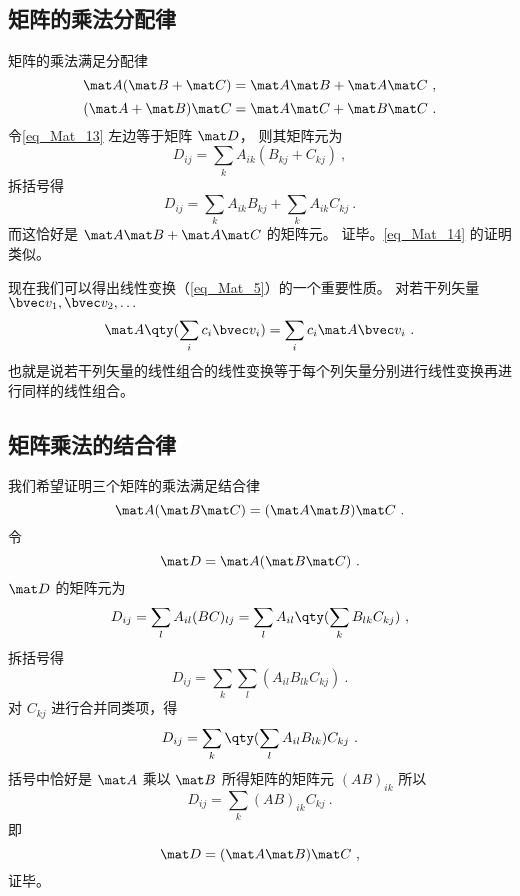 \subsection{矩阵的乘法分配律}
矩阵的乘法满足分配律
\begin{equation}\label{eq_Mat_13}
\mat A (\mat B + \mat C) = \mat A \mat B + \mat A \mat C~,
\end{equation}
\begin{equation}\label{eq_Mat_14}
(\mat A + \mat B) \mat C = \mat A \mat C + \mat B \mat C~.
\end{equation}
令\autoref{eq_Mat_13} 左边等于矩阵 $\mat D$， 则其矩阵元为
\begin{equation}
D_{ij} = \sum_k A_{ik} (B_{kj} + C_{kj})~,
\end{equation}
拆括号得
\begin{equation}
D_{ij} = \sum_k A_{ik}B_{kj} + \sum_k A_{ik}C_{kj}~.
\end{equation}
而这恰好是 $\mat A \mat B + \mat A \mat C$ 的矩阵元。 证毕。\autoref{eq_Mat_14} 的证明类似。

现在我们可以得出线性变换（\autoref{eq_Mat_5}）的一个重要性质。 对若干列矢量 $\bvec v_1, \bvec v_2, \dots$
\begin{equation}\label{eq_Mat_17}
\mat A \qty(\sum_i c_i \bvec v_i) = \sum_i c_i \mat A \bvec v_i~.
\end{equation}
也就是说若干列矢量的线性组合的线性变换等于每个列矢量分别进行线性变换再进行同样的线性组合。

\subsection{矩阵乘法的结合律}
我们希望证明三个矩阵的乘法满足结合律
\begin{equation}\label{eq_Mat_1}
\mat A (\mat B\mat C) = (\mat A \mat B) \mat C~.
\end{equation}
令
\begin{equation}
\mat D = \mat A (\mat B\mat C)~.
\end{equation}
$\mat D$ 的矩阵元为
\begin{equation}
D_{ij} = \sum_l A_{il} (BC)_{lj} = \sum_l A_{il} \qty(\sum_k B_{lk} C_{kj} )~,
\end{equation}
拆括号得
\begin{equation}
D_{ij} = \sum_k\sum_l  ( A_{il} B_{lk} C_{kj} )~.
\end{equation}
对 $C_{kj}$ 进行合并同类项，得
\begin{equation}
D_{ij} = \sum_k \qty(\sum_l A_{il} B_{lk} ) C_{kj} ~.
\end{equation}
括号中恰好是 $\mat A$ 乘以 $\mat B$ 所得矩阵的矩阵元 $(AB)_{ik}$ 所以
\begin{equation}
D_{ij} = \sum_k (AB)_{ik} C_{kj}~.
\end{equation}
即
\begin{equation}
\mat D = (\mat A\mat B)\mat C~,
\end{equation}
证毕。

